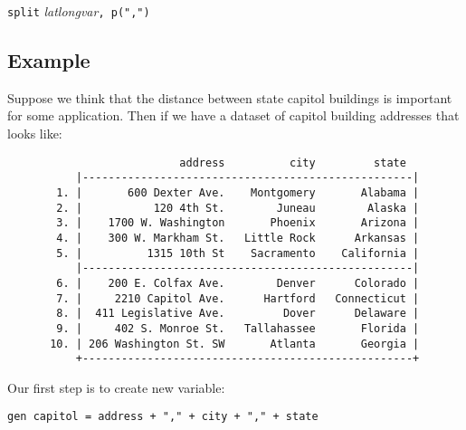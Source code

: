 \documentclass[12pt]{article}
\begin{document}
\begin{center}
\verb|split| \textit{latlongvar}\verb|, p(",")|
\end{center}

\subsection{Example}
Suppose we think that the distance between state capitol buildings is important for some application. Then if we have a dataset of capitol building addresses that looks like:



\begin{figure}[ht]
\begin{center}
\begin{verbatim}
                     address          city         state 
     |---------------------------------------------------|
  1. |       600 Dexter Ave.    Montgomery       Alabama |
  2. |           120 4th St.        Juneau        Alaska |
  3. |    1700 W. Washington       Phoenix       Arizona |
  4. |    300 W. Markham St.   Little Rock      Arkansas |
  5. |          1315 10th St    Sacramento    California |
     |---------------------------------------------------|
  6. |    200 E. Colfax Ave.        Denver      Colorado |
  7. |     2210 Capitol Ave.      Hartford   Connecticut |
  8. |  411 Legislative Ave.         Dover      Delaware |
  9. |     402 S. Monroe St.   Tallahassee       Florida |
 10. | 206 Washington St. SW       Atlanta       Georgia |
     +---------------------------------------------------+
\end{verbatim}
\end{center}
\end{figure}

Our first step is to create new variable:
\begin{center}
\verb|gen capitol = address + "," + city + "," + state|
\end{center}
\end{document}
